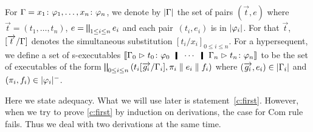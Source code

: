\documentclass[envcountsame]{llncs}
\begin{document}
For $\Gamma = {x_1} \colon{\varphi_1},\ldots,{x_n} \colon{\varphi_n}$,
we denote by $|{\Gamma}|$ the set of pairs $(\vec t,e)$ where
$\vec{t} = (t_1,\dots,t_n)$, $e = \bigparallel_{1\le i\le n} e_i$
 and each pair~$(t_i, e_i)$ is in $|{\varphi_i}|$.
For that $\vec t$, $[\overrightarrow{t}/\Gamma]$ denotes the simultaneous substitution
$[t_i/x_i]_{0\le i \le n}$.
For a hypersequent, we
define a set of s-executables
$
\semo{\G_0\tr\tj{t_0}{\phi_0}\hmid\cdots\hmid\G_n\tr\tj{t_n}{\phi_n}}
$
to be the set of executables of the form $\bigparallel_{0\le i\le
n}\left(t_i[\overrightarrow{g_i}/\Gamma_i],\pi_i\parallel e_i\parallel f_i\right)$ where
$(\overrightarrow{g_i},e_i) \in |{\Gamma_i}|$ and $(\pi_i,f_i)\in |{\varphi_i}|^-$.

Here we state adequacy.  What we will use later is statement~\ref{c:first}.
However, when we try to prove \ref{c:first} by induction on derivations,
the case for Com rule fails.  Thus we deal with two derivations at the
same time.
\end{document}
